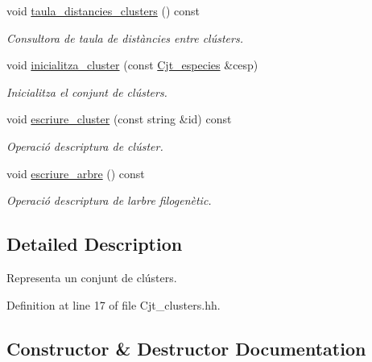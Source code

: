 \begin{DoxyCompactItemize}
void \hyperlink{class_cjt__clusters_ab243c775e0e2d64905ce744490d2f898}{taula\+\_\+distancies\+\_\+clusters} () const
\begin{DoxyCompactList}\small\item\em Consultora de taula de distàncies entre clústers. \end{DoxyCompactList}\item 
void \hyperlink{class_cjt__clusters_a0c0922c708fb014720a53bd560ebed61}{inicialitza\+\_\+cluster} (const \hyperlink{class_cjt__especies}{Cjt\+\_\+especies} \&cesp)
\begin{DoxyCompactList}\small\item\em Inicialitza el conjunt de clústers. \end{DoxyCompactList}\item 
void \hyperlink{class_cjt__clusters_ad023ea2a94f2629848f5c6b7162ac8d8}{escriure\+\_\+cluster} (const string \&id) const
\begin{DoxyCompactList}\small\item\em Operació d\textquotesingle{}escriptura de clúster. \end{DoxyCompactList}\item 
void \hyperlink{class_cjt__clusters_afdef4a4f7bd8ca2ecaf723c65cc10be0}{escriure\+\_\+arbre} () const
\begin{DoxyCompactList}\small\item\em Operació d\textquotesingle{}escriptura de l\textquotesingle{}arbre filogenètic. \end{DoxyCompactList}\end{DoxyCompactItemize}


\subsection{Detailed Description}
Representa un conjunt de clústers. 

Definition at line 17 of file Cjt\+\_\+clusters.\+hh.



\subsection{Constructor \& Destructor Documentation}
\mbox{\label{class_cjt__clusters_a10dd63eab0e8ea5b1ed13e81412d47a9}} 
